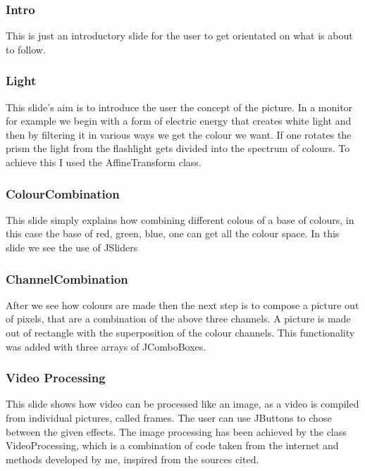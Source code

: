 \documentclass[a4paper, 11pt]{paper}
\begin{document}
\subsubsection{Intro}
\indent\par
This is just an introductory slide for the user to get orientated on what is about to follow.\\
\subsubsection{Light}
\indent\par
This slide's aim is to introduce the user the concept of the picture. In a monitor for example we begin with
a form of electric energy that creates white light and then by filtering it in various ways we get the colour we want.
If one rotates the prism the light from the flashlight gets divided into the spectrum of colours. To achieve this I used the AffineTransform class.\\
\subsubsection{ColourCombination}
\indent\par
This slide simply explains how combining different colous of a base of colours,
in this case the base of red, green, blue, one can get all the colour space. In this slide we see the use of JSliders\\
\subsubsection{ChannelCombination}
\indent\par
After we see how colours are made then the next step is to compose a picture out of pixels, that are a combination of the above three channels.
A picture is made out of rectangle with the superposition of the colour channels. This functionality was added with three arrays of JComboBoxes.\\
\subsubsection{Video Processing}
\indent\par
This slide shows how video can be processed like an image, as a video is compiled from individual pictures, called frames.
The user can use JButtons to chose between the given effects. The image processing has been achieved by the class VideoProcessing,
which is a combination of code taken from the internet and methods developed by me, inspired from the sources cited.\\
\end{document}
